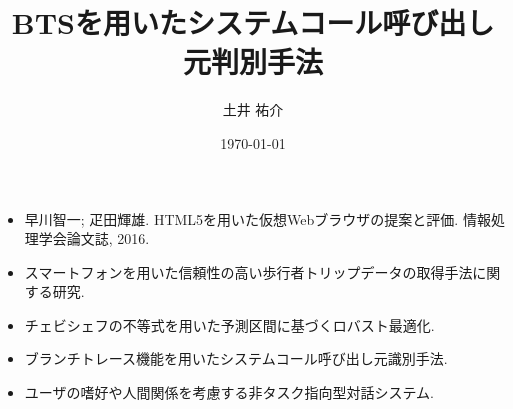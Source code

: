 \documentclass[dvipdfmx,8pt]{beamer}
\title{BTSを用いたシステムコール呼び出し元判別手法}
\author{土井 祐介}
\institute{Kaori Lab., Kyushu Institute of Technology}
\date{\today}
\begin{document}
\frame[plain]{
  \titlepage
}
\addtocounter{framenumber}{-1}
\begin{frame}
  \begin{itemize}
    \item 早川智一; 疋田輝雄. HTML5を用いた仮想Webブラウザの提案と評価. 情報処理学会論文誌, 2016. \cite{weko_148195_1}
    \item スマートフォンを用いた信頼性の高い歩行者トリップデータの取得手法に関する研究. \cite{2016d}
    \item チェビシェフの不等式を用いた予測区間に基づくロバスト最適化. \cite{weko_157917_1}
    \item ブランチトレース機能を用いたシステムコール呼び出し元識別手法. \cite{weko_148217_1}
    \item ユーザの嗜好や人間関係を考慮する非タスク指向型対話システム. \cite{2016g}
  \end{itemize}

	
	
\end{frame}

\end{document}

